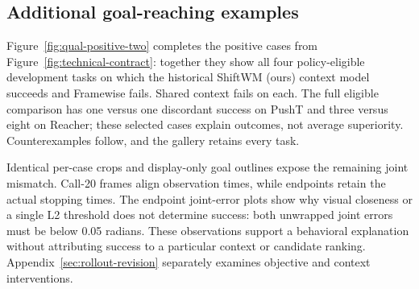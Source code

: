 \subsection{Additional goal-reaching examples}
Figure~\ref{fig:qual-positive-two} completes the positive cases from
Figure~\ref{fig:technical-contract}: together they show all four
policy-eligible development tasks on which the historical ShiftWM (ours)
context model succeeds and Framewise fails. Shared context fails on each.
The full eligible comparison has one versus one discordant success on PushT
and three versus eight on Reacher; these selected cases explain outcomes,
not average superiority. Counterexamples follow, and the gallery retains
every task.

Identical per-case crops and display-only goal outlines expose the remaining
joint mismatch. Call-20 frames align observation times, while endpoints retain
the actual stopping times. The endpoint joint-error plots show why visual
closeness or a single L2 threshold does not determine success: both unwrapped
joint errors must be below 0.05 radians. These observations support a
behavioral explanation without attributing success to a particular context
or candidate ranking. Appendix~\ref{sec:rollout-revision} separately examines
objective and context interventions.


